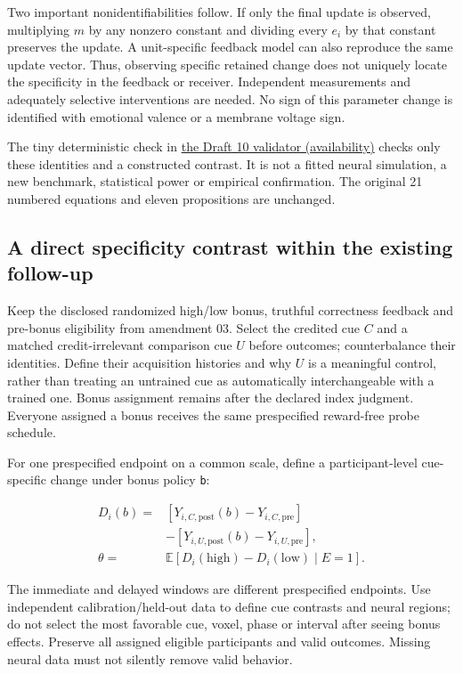 \documentclass[
  american,
  11pt,
  letterpaper,
]{article}
\begin{document}
Two important nonidentifiabilities follow. If only the final update is observed, multiplying \(m\) by any nonzero constant and dividing every \(e_i\) by that constant preserves the update. A unit-specific feedback model can also reproduce the same update vector. Thus, observing specific retained change does not uniquely locate the specificity in the feedback or receiver. Independent measurements and adequately selective interventions are needed. No sign of this parameter change is identified with emotional valence or a membrane voltage sign.

The tiny deterministic check in \href{https://github.com/v5ma/v5ma.github.io/blob/master/papers/companions/learning-to-feel-v1.0/ARTIFACT-AVAILABILITY.md\#artifact-31}{the Draft 10 validator (availability)} checks only these identities and a constructed contrast. It is not a fitted neural simulation, a new benchmark, statistical power or empirical confirmation. The original 21 numbered equations and eleven propositions are unchanged.

\subsection{A direct specificity contrast within the existing follow-up}\label{a-direct-specificity-contrast-within-the-existing-follow-up}

Keep the disclosed randomized high/low bonus, truthful correctness feedback and pre-bonus eligibility from amendment 03. Select the credited cue \(C\) and a matched credit-irrelevant comparison cue \(U\) before outcomes; counterbalance their identities. Define their acquisition histories and why \(U\) is a meaningful control, rather than treating an untrained cue as automatically interchangeable with a trained one. Bonus assignment remains after the declared index judgment. Everyone assigned a bonus receives the same prespecified reward-free probe schedule.

For one prespecified endpoint on a common scale, define a participant-level cue-specific change under bonus policy \texttt{b}:

\[\begin{aligned}D_i(b)={}&[Y_{i,C,\mathrm{post}}(b)-Y_{i,C,\mathrm{pre}}]\\&-[Y_{i,U,\mathrm{post}}(b)-Y_{i,U,\mathrm{pre}}],\\\theta={}&\mathbb E[D_i(\mathrm{high})-D_i(\mathrm{low})\mid E=1].\end{aligned}\]

The immediate and delayed windows are different prespecified endpoints. Use independent calibration/held-out data to define cue contrasts and neural regions; do not select the most favorable cue, voxel, phase or interval after seeing bonus effects. Preserve all assigned eligible participants and valid outcomes. Missing neural data must not silently remove valid behavior.
\end{document}
